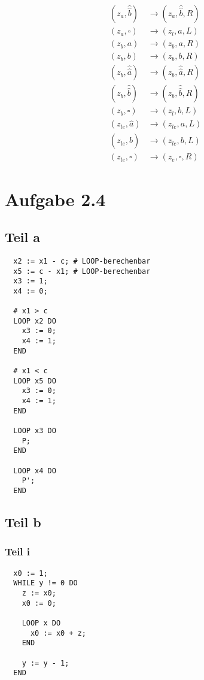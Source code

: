 \documentclass[10pt,a4paper]{article}
\begin{document}
\begin{align*}
  (z_{a}, \hat{\hat{b}}) & \rightarrow (z_{a}, \hat{\hat{b}}, R)\\
  (z_{a}, \square) & \rightarrow (z_{l}, a, L)\\
  (z_{b}, a) & \rightarrow (z_{b}, a, R)\\
  (z_{b}, b) & \rightarrow (z_{b}, b, R)\\
  (z_{b}, \hat{\hat{a}}) & \rightarrow (z_{b}, \hat{\hat{a}}, R)\\
  (z_{b}, \hat{\hat{b}}) & \rightarrow (z_{b}, \hat{\hat{b}}, R)\\
  (z_{b}, \square) & \rightarrow (z_{l}, b, L)\\
  (z_{le}, \hat{a}) & \rightarrow (z_{le}, a, L)\\
  (z_{le}, \hat{b}) & \rightarrow (z_{le}, b, L)\\
  (z_{le}, \square) & \rightarrow (z_{e}, \square, R)
\end{align*}

\section{Aufgabe 2.4}

\subsection{Teil a}

\begin{lstlisting}
  x2 := x1 - c; # LOOP-berechenbar
  x5 := c - x1; # LOOP-berechenbar
  x3 := 1;
  x4 := 0;

  # x1 > c
  LOOP x2 DO
    x3 := 0;
    x4 := 1;
  END

  # x1 < c
  LOOP x5 DO
    x3 := 0;
    x4 := 1;
  END

  LOOP x3 DO
    P;
  END

  LOOP x4 DO
    P';
  END
\end{lstlisting}

\subsection{Teil b}

\subsubsection{Teil i}

\begin{lstlisting}
  x0 := 1;
  WHILE y != 0 DO
    z := x0;
    x0 := 0;

    LOOP x DO
      x0 := x0 + z;
    END

    y := y - 1;
  END
\end{lstlisting}
\end{document}
